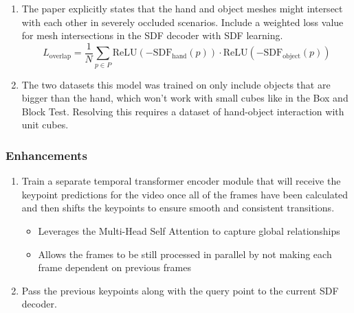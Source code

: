 \documentclass{article}
\begin{document}
\begin{enumerate}
    \item The paper explicitly states that the hand and object meshes might intersect with each
    other in severely occluded scenarios. Include a weighted loss value for mesh intersections in the SDF decoder with SDF learning.
    \[L_\text{overlap}=\frac{1}{N}\sum_{p\in P} \text{ReLU}(-\text{SDF}_\text{hand}(p))\cdot \text{ReLU}(-\text{SDF}_\text{object}(p))\]
    \item The two datasets this model was trained on only include objects that are bigger than the
    hand, which won't work with small cubes like in the Box and Block Test. Resolving this requires a dataset of hand-object interaction with unit cubes.
\end{enumerate}
\subsubsection*{Enhancements}
\begin{enumerate}
    \item Train a separate temporal transformer encoder module that will receive the keypoint predictions for the video once all of the frames have been calculated and then shifts the keypoints to ensure smooth and consistent transitions.
    \begin{itemize}
        \item Leverages the Multi-Head Self Attention to capture global relationships
        \item Allows the frames to be still processed in parallel by not making each frame dependent on previous frames
    \end{itemize}
    \item Pass the previous keypoints along with the query point to the current SDF decoder.
\end{enumerate}
\end{document}
